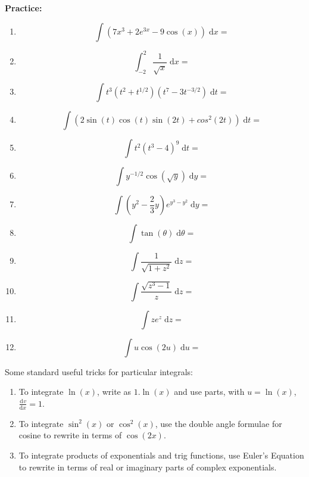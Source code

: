 \documentclass{article}
\newcommand{\deriv}[3][]{\frac{\mathrm{d}^{#1}#2}{\mathrm{d}#3^{#1}}}
\newcommand{\diff}{\;\mathrm{d}}
\begin{document}
\textbf{Practice:}\bigskip


\begin{enumerate}
	\item \[\int (7x^3+2e^{3x}-9\cos(x))\diff x=\]
	\item \[\int_{-2}^2 \frac{1}{\sqrt{x}}\diff x=\]
	\item \[\int t^3(t^2+t^{1/2})(t^7-3t^{-3/2})\diff t=\]
	\item \[\int (2\sin(t)\cos(t)\sin(2t)+cos^2(2t) )\diff t=\]
	\item \[\int t^2(t^3-4)^9\diff t=\]
	\item \[\int y^{-1/2}\cos\left(\sqrt{y}\right)\diff y=\]
	\item \[\int \left(y^2-\frac{2}{3}y\right)e^{y^3-y^2}\diff y=\]
	\item \[\int \tan(\theta)\diff \theta=\]
	\item \[\int\frac{1}{\sqrt{1+z^2}}\diff z=\]
	\item \[\int\frac{\sqrt{z^3-1}}{z}\diff z=\]
	\item \[\int ze^{z}\diff z=\]
	\item \[\int u\cos(2u)\diff u=\]
\end{enumerate}

\clearpage


Some standard useful tricks for particular integrals:

\begin{enumerate}
	\item To integrate $\ln(x)$, write as $1.\ln(x)$ and use parts, with $u=\ln(x)$, $\deriv{v}{x}=1$.
	\item To integrate $\sin^2(x)$ or $\cos^2(x)$, use the double angle formulae for cosine to rewrite in terms of $\cos(2x)$.
	\item To integrate products of exponentials and trig functions, use Euler's Equation to rewrite in terms of real or imaginary parts of complex exponentials.
\end{enumerate}
\end{document}
